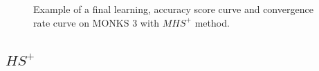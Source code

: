\begin{appendices}
\begin{figure}[H]
\begin{subfigure}{0.40\textwidth}
                    \label{fig:monks_3_ACC_CGD}
                \end{subfigure}
                \begin{subfigure}{0.40\textwidth}
                    \caption{}
                    \label{fig:monks_3_NORM_CGD}
                \end{subfigure}
                \caption{Example of a final learning, accuracy score curve and
                convergence rate curve on MONKS 3 with $MHS^+$ method.}
                \label{fig:monks_3_CGD}
            \end{figure}

          


            \subsection{$HS^+$} %
            \label{sub:hs}


\end{appendices}
